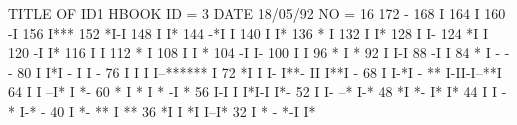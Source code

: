 \begin{Listing}
 TITLE OF ID1                                                                    
 HBOOK     ID =         3                                        DATE  18/05/92              NO =    16
      172                                    -
      168                                    I
      164                                    I
      160                                   -I
      156                                   I***
      152                                   *I-I
      148                                   I  I*
      144                                 -*I   I
      140                                 I     I*
      136                                 *      I
      132                                 I      I*
      128                                 I      I-
      124                                *I       I
      120                               -I        I*
      116                               I         I
      112                               *         I
      108                               I         I *
      104                              -I         I-
      100                              I           I
       96                              *           I *
       92                              I           I-I
       88                             -I             I
       84                             *              I -                              - -
       80                             I              I*I                        -     I I  -
       76                             I              I I                        I--******  I
       72                            *I              I I-                       I**- II I**I -
       68                             I              I-*I                    - **  I-II-I--**I
       64                             I                 I                  --I* I            *-
       60                           * I                 *                  I * -I             *
       56                           I-I                 I                  I*I-I              I*-
       52                           I                   I-               --*                  I-*
       48                          *I                    *-              I*                     I*
       44                          I                      I             -*                      I-* -
       40                          I                      *-           **                        I **
       36                         *I                       I          *I                         I--I*
       32                          I                       *    -    *-I                             I*

\end{Listing}
